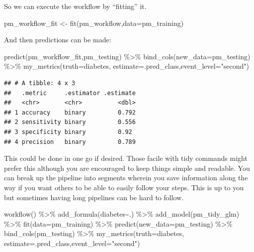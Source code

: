 \documentclass[
]{article}
\newenvironment{Shaded}{\begin{snugshade}}{\end{snugshade}}
\newcommand{\AttributeTok}[1]{\textcolor[rgb]{0.77,0.63,0.00}{#1}}
\newcommand{\FunctionTok}[1]{\textcolor[rgb]{0.00,0.00,0.00}{#1}}
\newcommand{\NormalTok}[1]{#1}
\newcommand{\OtherTok}[1]{\textcolor[rgb]{0.56,0.35,0.01}{#1}}
\newcommand{\SpecialCharTok}[1]{\textcolor[rgb]{0.00,0.00,0.00}{#1}}
\newcommand{\StringTok}[1]{\textcolor[rgb]{0.31,0.60,0.02}{#1}}
\begin{document}
So we can execute the workflow by ``fitting'' it.

\begin{Shaded}
\begin{Highlighting}[]
\NormalTok{pm\_workflow\_fit }\OtherTok{\textless{}{-}} \FunctionTok{fit}\NormalTok{(pm\_workflow,}\AttributeTok{data=}\NormalTok{pm\_training)}
\end{Highlighting}
\end{Shaded}

And then predictions can be made:

\begin{Shaded}
\begin{Highlighting}[]
\FunctionTok{predict}\NormalTok{(pm\_workflow\_fit,pm\_testing) }\SpecialCharTok{\%\textgreater{}\%}
  \FunctionTok{bind\_cols}\NormalTok{(}\AttributeTok{new\_data=}\NormalTok{pm\_testing) }\SpecialCharTok{\%\textgreater{}\%}
  \FunctionTok{my\_metrics}\NormalTok{(}\AttributeTok{truth=}\NormalTok{diabetes, }\AttributeTok{estimate=}\NormalTok{.pred\_class,}\AttributeTok{event\_level=}\StringTok{"second"}\NormalTok{) }
\end{Highlighting}
\end{Shaded}

\begin{verbatim}
## # A tibble: 4 x 3
##   .metric     .estimator .estimate
##   <chr>       <chr>          <dbl>
## 1 accuracy    binary         0.792
## 2 sensitivity binary         0.556
## 3 specificity binary         0.92 
## 4 precision   binary         0.789
\end{verbatim}

This could be done in one go if desired. Those facile with tidy commands
might prefer this although you are encouraged to keep things simple and
readable. You can break up the pipeline into segments wherein you save
information along the way if you want others to be able to easily follow
your steps. This is up to you but sometimes having long pipelines can be
hard to follow.

\begin{Shaded}
\begin{Highlighting}[]
\FunctionTok{workflow}\NormalTok{() }\SpecialCharTok{\%\textgreater{}\%}
  \FunctionTok{add\_formula}\NormalTok{(diabetes}\SpecialCharTok{\textasciitilde{}}\NormalTok{.) }\SpecialCharTok{\%\textgreater{}\%} 
  \FunctionTok{add\_model}\NormalTok{(pm\_tidy\_glm) }\SpecialCharTok{\%\textgreater{}\%} 
  \FunctionTok{fit}\NormalTok{(}\AttributeTok{data=}\NormalTok{pm\_training) }\SpecialCharTok{\%\textgreater{}\%}
  \FunctionTok{predict}\NormalTok{(}\AttributeTok{new\_data=}\NormalTok{pm\_testing) }\SpecialCharTok{\%\textgreater{}\%}
  \FunctionTok{bind\_cols}\NormalTok{(pm\_testing) }\SpecialCharTok{\%\textgreater{}\%}
  \FunctionTok{my\_metrics}\NormalTok{(}\AttributeTok{truth=}\NormalTok{diabetes, }\AttributeTok{estimate=}\NormalTok{.pred\_class,}\AttributeTok{event\_level=}\StringTok{"second"}\NormalTok{) }
\end{Highlighting}
\end{Shaded}
\end{document}
